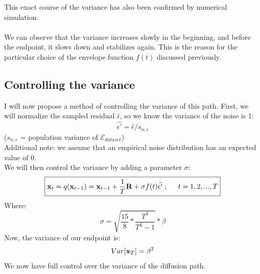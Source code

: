 \documentclass[twocolumn]{article}
\begin{document}
\begin{appendices}
\begin{center}
\end{center}

This exact course of the variance has also been confirmed by numerical simulation.\\
\\
We can observe that the variance increases slowly in the beginning, and before the endpoint, it slows down and stabilizes again. This is the reason for the particular choice of the envelope function $f(t)$ discussed previously.

\subsection{Controlling the variance}
I will now propose a method of controlling the variance of this path. 
First, we will normalize the sampled residual $\hat{\epsilon}$, so we know the variance of the noise is 1:
\begin{equation}
    \hat{\epsilon'} = \hat{\epsilon} / s_{n,\epsilon}
\end{equation}
($s_{n,\epsilon}$ = population variance of $\mathcal{E}_{dataset}$)\\
Additional note: we assume that an empirical noise distribution has an expected value of 0.\\
We will then control the variance by adding a parameter $\sigma$:
\begin{equation}
    \boxed{\bold{x}_t = q(\bold{x}_{t-1}) = \bold{x}_{t-1} + \frac{1}{T} \bold{R} + \sigma f(t) \hat{\epsilon'} \hspace{.1cm};\hspace{.5cm} t=1,2,...,T}
\end{equation}
Where: 
\begin{equation}
    \sigma = \sqrt{\frac{15}{8} * \frac{T^3}{T^4 - 1}} * \beta
\end{equation}
Now, the variance of our endpoint is: 
\begin{equation}
    Var[\bold{x}_T] = \beta^2
\end{equation}
We now have full control over the variance of the diffusion path.


\end{appendices}
\end{document}
